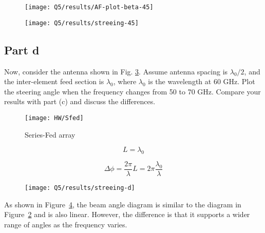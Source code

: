 \documentclass[12pt,onecolumn,a4paper]{article}
\begin{document}
\begin{figure}[H]
	\centering
	\texttt{[image: Q5/results/AF-plot-beta-45]}
	\caption{}
	\label{fig:af-plot-beta-45}
\end{figure}



\begin{figure}[H]
	\centering
	\texttt{[image: Q5/results/streeing-45]}
	\caption{}
	\label{fig:streeing-45}
\end{figure}





\subsection{Part d}
{\color{questioncolor}
Now, consider the antenna shown in Fig. \ref{Fig3}. Assume antenna spacing is $\lambda_0/2$, and the inter-element feed section is  $\lambda_0$, where $\lambda_0$ is the wavelength at 60 GHz. Plot the steering angle when the frequency changes from 50 to 70 GHz. Compare your results with part (c) and discuss the differences.

\begin{figure}[h]
\centering
\texttt{[image: HW/Sfed]}
\caption{Series-Fed array}
\label{Fig3}
\end{figure}
}
	\begin{equation}
		L = \lambda_0
	\end{equation}
	
	\begin{equation}
		\Delta\phi = \frac{2\pi}{\lambda}L = 2\pi \frac{\lambda_0}{\lambda}
	\end{equation}
	
	
	\begin{figure}[H]
		\centering
		\texttt{[image: Q5/results/streeing-d]}
		\caption{}
		\label{fig:streeing-d}
	\end{figure}
	
	As shown in Figure~\ref{fig:streeing-d}, the beam angle diagram is similar to the diagram in Figure~\ref{fig:streeing-45} and is also linear. However, the difference is that it supports a wider range of angles as the frequency varies.
	
	
	
	
	\newpage
	
	
	
\end{document}
